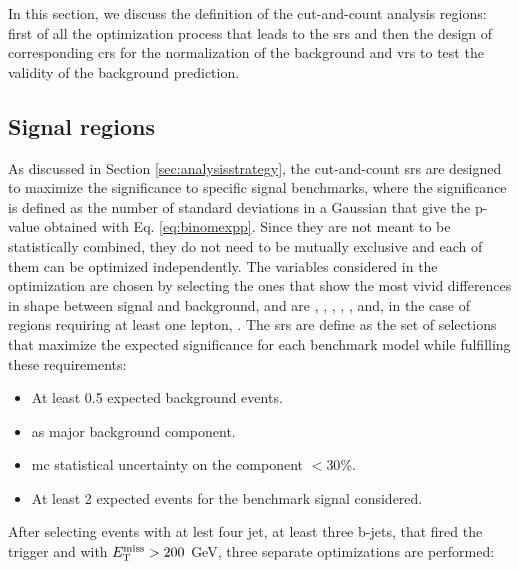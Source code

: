 In this section, we discuss the definition of the cut-and-count analysis regions: 
first of all the optimization process that leads to the \glspl{sr} and then the 
design of corresponding \glspl{cr} for the normalization of the \ttbar background and 
\glspl{vr} to test the validity of the background prediction.

\subsection*{Signal regions}

As discussed in Section \ref{sec:analysisstrategy}, the cut-and-count \glspl{sr} are designed to maximize the significance to specific 
signal benchmarks, where the significance is defined as the number of standard deviations in a Gaussian that give the p-value obtained with Eq. \ref{eq:binomexpp}.
Since they are not meant to be statistically combined, they do not need to be mutually exclusive and each of them can be optimized independently.
The variables considered in the optimization are chosen by selecting the ones that show the most vivid differences in shape between signal and background, and are \njet, \nbjet, \met, \meff, \mjsum, \mtb and, in the case of regions requiring at least one lepton, \mt.
The \glspl{sr} are define as the set of selections that maximize the expected significance for each benchmark model while fulfilling these requirements:
\begin{itemize}
\item At least 0.5 expected background events.
\item \ttbar as major background component.
\item \gls{mc} statistical uncertainty on the \ttbar component $<30$\%.
\item At least 2 expected events for the benchmark signal considered. 
\end{itemize}
After selecting events with at lest four jet, at least three b-jets, that fired the \met trigger and with $E_{\rm T}^{\mathrm{miss}}>200$ GeV, three separate optimizations are performed:

